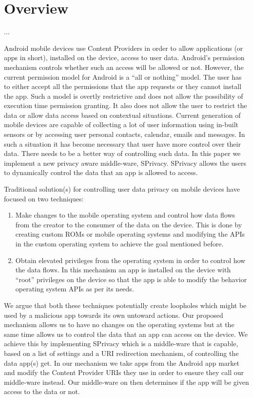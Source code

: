 \section{Overview}
...

Android mobile devices use Content Providers in order to allow applications (or apps in short), installed on the device, access to user data. Android's permission mechanism controls whether such an access will be allowed or not. However, the current permission model for Android is a ``all or nothing'' model. The user has to either accept all the permissions that the app requests or they cannot install the app. Such a model is overtly restrictive and does not allow the possibility of execution time permission granting. It also does not allow the user to restrict the data or allow data access based on contextual situations. Current generation of mobile devices are capable of collecting a lot of user information using in-built sensors or by accessing user personal contacts, calendar, emails and messages. In such a situation it has become necessary that user have more control over their data. There needs to be a better way of controlling such data. In this paper we implement a new privacy aware middle-ware, SPrivacy. SPrivacy allows the users to dynamically control the data that an app is allowed to access. 

Traditional solution(s) for controlling user data privacy on mobile devices have focused on two techniques:
\begin{enumerate}
	\item Make changes to the mobile operating system and control how data flows from the creator to the consumer of the data on the device. This is done by creating custom ROMs or mobile operating systems and modifying the APIs in the custom operating system to achieve the goal mentioned before.
	\item Obtain elevated privileges from the operating system in order to control how the data flows. In this mechanism an app is installed on the device with ``root'' privileges on the device so that the app is able to modify the behavior operating system APIs as per its needs.
\end{enumerate}

We argue that both these techniques potentially create loopholes which might be used by a malicious app towards its own untoward actions. Our proposed mechanism allows us to have no changes on the operating systems but at the same time allows us to control the data that an app can access on the device. We achieve this by implementing SPrivacy which is a middle-ware that is capable, based on a list of settings and a URI redirection mechanism, of controlling the data app(s) get. In our mechanism we take apps from the Android app market and modify the Content Provider URIs they use in order to ensure they call our middle-ware instead. Our middle-ware on then determines if the app will be given access to the data or not.

